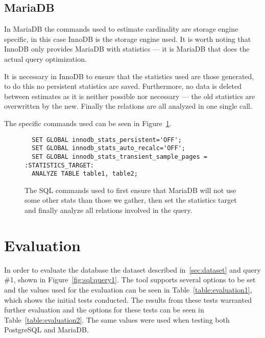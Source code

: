 \subsection{MariaDB}\label{sec:mariadb}
In MariaDB the commands used to estimate cardinality are storage engine specific,
in this case InnoDB is the storage engine used. It is worth noting that InnoDB only
provides MariaDB with statistics --- it is MariaDB that does the actual
query optimization.

It is necessary in InnoDB to ensure that the statistics used are those
generated, to do this no persistent statistics are saved. Furthermore, no data
is deleted between estimates as it is neither possible nor necessary --- the old
statistics are overwritten by the new. Finally the relations are all analyzed in
one single  call.

The specific commands used can be seen in Figure~\ref{fig:sql:resamplemdb}.

\begin{figure}[ht]
\begin{verbatim}
  SET GLOBAL innodb_stats_persistent='OFF';
  SET GLOBAL innodb_stats_auto_recalc='OFF';
  SET GLOBAL innodb_stats_transient_sample_pages = :STATISTICS_TARGET:
  ANALYZE TABLE table1, table2;
\end{verbatim}
\caption[Generating new cardinality estimates in MariaDB.]{The SQL commands used to
first ensure that MariaDB will not use some other stats than those we gather,
then set the statistics target and finally analyze all relations involved in the query.}
\label{fig:sql:resamplemdb}
\end{figure}

\section{Evaluation}\label{sec:evaluation}
In order to evaluate the database the dataset described in~\ref{sec:dataset} and
query \#1, shown in Figure~\ref{fig:sql:query1}. The tool supports several
options to be set and the values used for the evaluation can be seen in
Table~\ref{table:evaluation1}, which shows the initial tests conducted. The
results from these tests warranted further evaluation and the options for these
tests can be seen in Table~\ref{table:evaluation2}. The same values were used
when testing both PostgreSQL and MariaDB.\@

